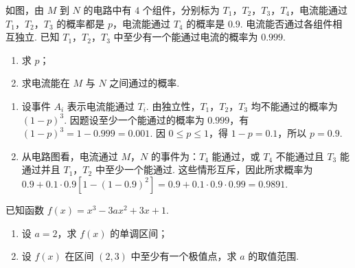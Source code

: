 \begin{problem}
如图，由 \(M\) 到 \(N\) 的电路中有 \(4\) 个组件，分别标为 \(T_{1}\)，\(T_{2}\)，\(T_{3}\)，\(T_{4}\)，电流能通过 \(T_{1}\)，\(T_{2}\)，\(T_{3}\) 的概率都是 \(p\)，电流能通过 \(T_{4}\) 的概率是 \(0.9\). 电流能否通过各组件相互独立. 已知 \(T_{1}\)，\(T_{2}\)，\(T_{3}\) 中至少有一个能通过电流的概率为 \(0.999\).

\begin{enumerate}
\item 求 \(p\)；
\item 求电流能在 \(M\) 与 \(N\) 之间通过的概率.
\end{enumerate}

\end{problem}

\begin{solution}
\begin{enumerate}
\item 设事件 \(A_i\) 表示电流能通过 \(T_i\). 由独立性，\(T_1\)，\(T_2\)，\(T_3\) 均不能通过的概率为 \((1-p)^3\). 因题设至少一个能通过的概率为 \(0.999\)，有 \((1-p)^3=1-0.999=0.001\). 因 \(0\leqslant p\leqslant1\)，得 \(1-p=0.1\)，所以 \(p=0.9\).
\item 从电路图看，电流通过 \(M\)，\(N\) 的事件为：\(T_4\) 能通过，或 \(T_4\) 不能通过且 \(T_3\) 能通过并且 \(T_1\)，\(T_2\) 中至少一个能通过. 这些情形互斥，因此所求概率为 \(0.9+0.1\cdot0.9\left[1-(1-0.9)^2\right]=0.9+0.1\cdot0.9\cdot0.99=0.9891\).
\end{enumerate}
\end{solution}

\begin{problem}
已知函数 \(f(x) = x^3 - 3ax^2 + 3x + 1\).

\begin{enumerate}
\item 设 \(a = 2\)，求 \(f(x)\) 的单调区间；
\item 设 \(f(x)\) 在区间 \((2,3)\) 中至少有一个极值点，求 \(a\) 的取值范围.
\end{enumerate}
\end{problem}

